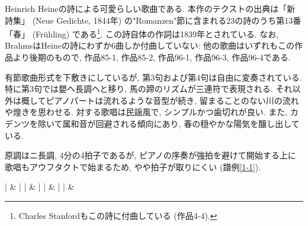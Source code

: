 \vspace*{5truemm}

Heinrich Heineの詩による可愛らしい歌曲である.
本作のテクストの出典は「新詩集」 (Neue Gedichte, 1844年) の"Romanzen"節に含まれる23の詩のうち第13番「春」
(Frühling) である\footnote{Charles Stanfordもこの詩に付曲している (作品4-4).}\cite{liedernet}.
この詩自体の作詞は1839年とされている.
なお, BrahmsはHeineの詩にわずか6曲しか付曲していない:
他の歌曲はいずれもこの作品より後期のもので, 作品85-1, 作品85-2, 作品96-1, 作品96-3, 作品96-4である.

有節歌曲形式を下敷きにしているが, 第3句および第4句は自由に変奏されている.
特に第3句では嬰ヘ長調へと移り, 馬の蹄のリズムが三連符で表現される.
それ以外は概してピアノパートは流れるような音型が続き, 留まることのない川の流れや煌きを思わせる.
対する歌唱は民謡風で, シンプルかつ歯切れが良い.
また, カデンツを除いて属和音が回避される傾向にあり, 春の穏やかな陽気を醸し出している.

原調はニ長調, 4分の4拍子であるが, ピアノの序奏が強拍を避けて開始する上に歌唱もアウフタクトで始まるため, やや拍子が取りにくい (譜例\ref{1-1}).

\musicbegin
	\def\nbinstruments{2}%
	\generalmeter{\meterC}%
	\startextract%
	\nnnotes\cl{*}\enotes
	\zchangeclefs
	\notesp
		\ds{}|%
		\ds{}&%
	\enotes
	\nnnotes\cl{*}\enotes
	\def\atnextbar{\znotes&\centerbar{\cpause}\en}%
	\zchangeclefs
	\bar
	\notesp
		|%
		&%
		\cu{*}\hpause\cu{**}\qp\cu{*}
	\enotes
	\bar
	\notesp
		|%
		&%
	\enotes
	\bar
	\notesp
		|%
		&%
	\enotes
	\endextract
{}

